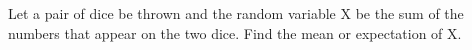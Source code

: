 \begin{flushleft}
Let a pair of dice be thrown and the random variable X be the sum of the numbers that
appear on the two dice. Find the mean or expectation of X.
\end{flushleft}